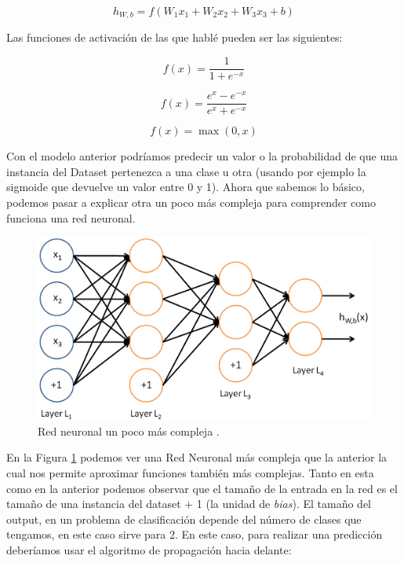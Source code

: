 $$h_{W,b}=f(W_1 x_1+ W_2 x_2 + W_3 x_3 + b)$$

Las funciones de activación de las que hablé pueden ser las siguientes:

\begin{equation}
	f(x) = \frac{1}{1+e^{-x}}
	\label{eq:sigmoid}
\end{equation}

\begin{equation}
	f(x) = \frac{e^x - e^{-x}}{e^x + e^{-x}}
	\label{eq:tanh}
\end{equation}

\begin{equation}
	f(x) = \max (0, x)
	\label{eq:RELU}
\end{equation}

Con el modelo anterior podríamos predecir un valor o la probabilidad de que una instancia del Dataset pertenezca a una clase u otra (usando por ejemplo la sigmoide que devuelve un valor entre 0 y 1). Ahora que sabemos lo básico, podemos pasar a explicar otra un poco más compleja para comprender como funciona una red neuronal. \newline

\begin{figure}[H]
	\includegraphics[scale=0.2]{imagenes/03_Estado_del_arte/complexnn.png}
	\centering
	\caption{Red neuronal un poco más compleja \cite{ng}.}
	\label{fig:complexnn}
\end{figure}

En la Figura \ref{fig:complexnn} podemos ver una Red Neuronal más compleja que la anterior la cual nos permite aproximar funciones también más complejas. Tanto en esta como en la anterior podemos observar que el tamaño de la entrada en la red es el tamaño de una instancia del dataset + 1 (la unidad de \textit{bias}). El tamaño del output, en un problema de clasificación depende del número de clases que tengamos, en este caso sirve para 2. En este caso, para realizar una predicción deberíamos usar el algoritmo de propagación hacia delante:

